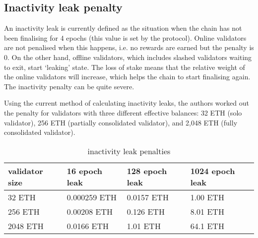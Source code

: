 \documentclass{article}
\begin{document}
\subsection{Inactivity leak penalty}
An inactivity leak is currently defined as the situation when the chain has not
been finalising for 4 epochs (this value is set by the protocol). Online
validators are not penalised when this happens, i.e. no rewards are earned but
the penalty is 0. On the other hand, offline validators, which includes slashed
validators waiting to exit, start `leaking' state. The loss of stake means that
the relative weight of the online validators will increase, which helps the
chain to start finalising again. The inactivity penalty can be quite severe. 

Using the current method of calculating inactivity leaks, the authors worked
out the penalty for validators with three different effective balances: 32 ETH
(solo validator), 256 ETH (partially consolidated validator),  and 2,048 ETH
(fully consolidated validator).

\begin{table}[htp]
\caption{inactivity leak penalties}
\begin{center}
\renewcommand{\arraystretch}{1.3}
\begin{tabular}{|l|l|l|l|}
\hline
\textbf{validator size} & \textbf{16 epoch leak} & \textbf{128 epoch leak} & \textbf{1024 epoch leak} \\
\hline
32 ETH & 0.000259 ETH & 0.0157 ETH & 1.00 ETH \\
256 ETH & 0.00208 ETH & 0.126 ETH & 8.01 ETH \\
2048 ETH & 0.0166 ETH & 1.01 ETH & 64.1 ETH \\
\hline
\end{tabular}
\end{center}
\label{default}
\end{table}%


\end{document}
